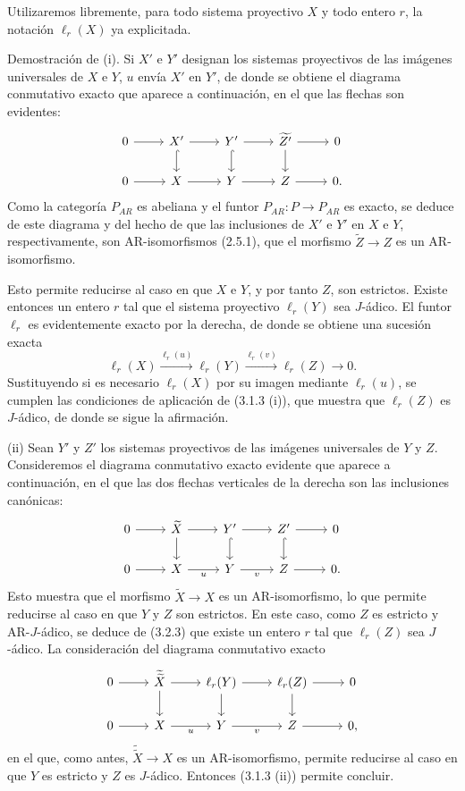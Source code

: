 \begin{prooftext}[Demostración]
Utilizaremos libremente, para todo sistema proyectivo $X$ y todo entero $r$, la notación $\ell_r(X)$ ya explicitada.

Demostración de (i). Si $X'$ e $Y'$ designan los sistemas proyectivos de las imágenes universales de $X$ e $Y$, $u$ envía $X'$ en $Y'$, de donde se obtiene el diagrama conmutativo exacto que aparece a continuación, en el que las flechas son evidentes:
\[
\begin{tikzcd}
0 \arrow[r] & X' \arrow[r] \arrow[d,hook] & Y' \arrow[r] \arrow[d,hook] & \widetilde{Z'} \arrow[r] \arrow[d] & 0\\
0 \arrow[r] & X \arrow[r] & Y \arrow[r] & Z \arrow[r] & 0 .
\end{tikzcd}
\]
Como la categoría $P_{AR}$ es abeliana y el funtor $P_{AR}\colon P\to P_{AR}$ es exacto, se deduce de este diagrama y del hecho de que las inclusiones de $X'$ e $Y'$ en $X$ e $Y$, respectivamente, son AR-isomorfismos (2.5.1), que el morfismo $\widetilde Z\to Z$ es un AR-isomorfismo.

Esto permite reducirse al caso en que $X$ e $Y$, y por tanto $Z$, son estrictos. Existe entonces un entero $r$ tal que el sistema proyectivo $\ell_r(Y)$ sea $J$-ádico. El funtor $\ell_r$ es evidentemente exacto por la derecha, de donde se obtiene una sucesión exacta
\[
\ell_r(X)\stackrel{\ell_r(u)}{\longrightarrow}\ell_r(Y)\stackrel{\ell_r(v)}{\longrightarrow}\ell_r(Z)\longrightarrow0.
\]
Sustituyendo si es necesario $\ell_r(X)$ por su imagen mediante $\ell_r(u)$, se cumplen las condiciones de aplicación de (3.1.3 (i)), que muestra que $\ell_r(Z)$ es $J$-ádico, de donde se sigue la afirmación.

(ii) Sean $Y'$ y $Z'$ los sistemas proyectivos de las imágenes universales de $Y$ y $Z$. Consideremos el diagrama conmutativo exacto evidente que aparece a continuación, en el que las dos flechas verticales de la derecha son las inclusiones canónicas:
\[
\begin{tikzcd}
0 \arrow[r] & \widetilde X \arrow[r] \arrow[d] & Y' \arrow[r] \arrow[d,hook] & Z' \arrow[r] \arrow[d,hook] & 0\\
0 \arrow[r] & X \arrow[r,"u"'] & Y \arrow[r,"v"'] & Z \arrow[r] & 0 .
\end{tikzcd}
\]
Esto muestra que el morfismo $\widetilde X\to X$ es un AR-isomorfismo, lo que permite reducirse al caso en que $Y$ y $Z$ son estrictos. En este caso, como $Z$ es estricto y AR-$J$-ádico, se deduce de (3.2.3) que existe un entero $r$ tal que $\ell_r(Z)$ sea $J$-ádico. La consideración del diagrama conmutativo exacto
\[
\begin{tikzcd}
0 \arrow[r] & \widetilde{\widetilde X} \arrow[r] \arrow[d] & \ell_r(Y) \arrow[r] \arrow[d] & \ell_r(Z) \arrow[r] \arrow[d] & 0\\
0 \arrow[r] & X \arrow[r,"u"'] & Y \arrow[r,"v"'] & Z \arrow[r] & 0,
\end{tikzcd}
\]
en el que, como antes, $\widetilde{\widetilde X}\to X$ es un AR-isomorfismo, permite reducirse al caso en que $Y$ es estricto y $Z$ es $J$-ádico. Entonces (3.1.3 (ii)) permite concluir.
\end{prooftext}
